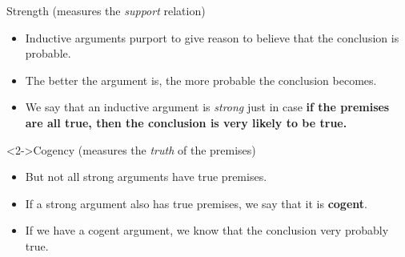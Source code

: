 \begin{block}{Strength (measures the \textit{support} relation)}
\begin{itemize}
  \item Inductive arguments purport to give reason to believe that the conclusion is probable.
  \item The better the argument is, the more probable the conclusion becomes.
  \item We say that an inductive argument is \textit{strong} just in case \textbf{if the premises are all true, then the conclusion is very likely to be true.}
\end{itemize}
\end{block}

\begin{block}<2->{Cogency (measures the \textit{truth} of the premises)}
\begin{itemize}
  \item But not all strong arguments have true premises.
  \item If a strong argument also has true premises, we say that it is \textbf{cogent}.
  \item If we have a cogent argument, we know that the conclusion very probably true.
\end{itemize}
\end{block}

